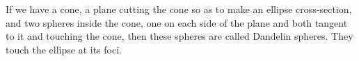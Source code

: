  If we have a cone, a plane cutting the cone so as to make
an ellipse cross-section, and two spheres inside the cone,
one on each side of the plane and both tangent to it
and touching the cone, then these spheres are called
Dandelin spheres. They touch the ellipse at its foci.
